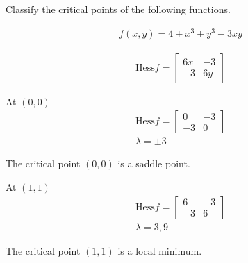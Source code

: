Classify the critical points of the following functions.

\begin{align*}
    f(x, y) = 4 + x^3 + y^3 - 3xy
\end{align*}

\begin{solution}
\begin{align*}
    \mathrm{Hess} f = \begin{bmatrix}
        6x & -3 \\
        -3 & 6y
    \end{bmatrix}
\end{align*}

At $(0, 0)$
\begin{align*}
    \mathrm{Hess} f = \begin{bmatrix}
        0 & -3 \\
        -3 & 0
    \end{bmatrix} \\
    \lambda = \pm 3
\end{align*}

The critical point $(0, 0)$ is a saddle point.

At $(1, 1)$
\begin{align*}
    \mathrm{Hess} f = \begin{bmatrix}
        6 & -3 \\
        -3 & 6
    \end{bmatrix} \\
    \lambda = 3, 9
\end{align*}

The critical point $(1, 1)$ is a local minimum.
\end{solution}
